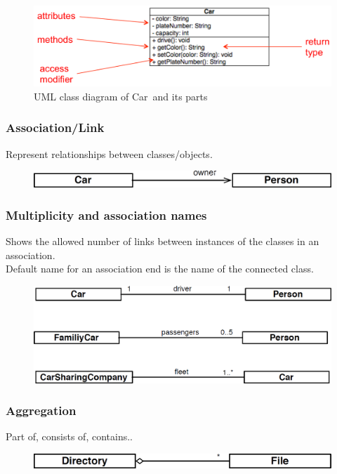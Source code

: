 \begin{figure}[h!]
	\centering
	\includegraphics[width=\linewidth]{images/oop_uml_class}
	\caption{UML class diagram of \glqq Car\grqq \ and its parts}
\end{figure}

\subsubsection*{Association/Link}
Represent relationships between classes/objects.
\begin{figure}[H]
	\centering
	\includegraphics[width=0.85\linewidth]{images/oop_association}
\end{figure}
\subsubsection*{Multiplicity and association names}
Shows the allowed number of links between instances of the classes in an association.\\
Default name for an association end is the name of the connected class.
\begin{figure}[H]
	\centering
	\includegraphics[width=0.85\linewidth]{images/oop_multiplicity}
\end{figure}
\subsubsection*{Aggregation}
Part of, consists of, contains..
\begin{figure}[H]
	\centering
	\includegraphics[width=0.85\linewidth]{images/oop_aggregation}
\end{figure}

